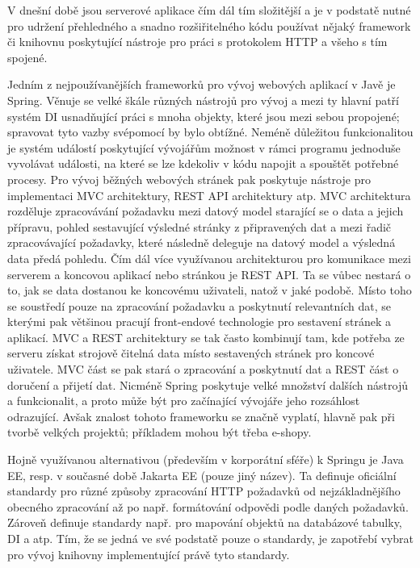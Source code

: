 		V dnešní době jsou serverové aplikace čím dál tím složitější a je v podstatě nutné pro udržení
		přehledného a snadno rozšiřitelného kódu používat nějaký framework
		či knihovnu poskytující nástroje pro práci s protokolem \Ac{HTTP} a všeho s tím spojené.

		Jedním z nejpoužívanějších frameworků pro vývoj webových aplikací v Javě je Spring.
		Věnuje se velké škále různých nástrojů pro vývoj a mezi ty hlavní patří systém \Ac{DI} usnadňující práci s
		mnoha objekty, které jsou mezi sebou propojené; spravovat tyto vazby svépomocí by bylo obtížné.
		Neméně důležitou funkcionalitou je systém událostí poskytující vývojářům možnost v rámci programu jednoduše vyvolávat
		události, na které se lze kdekoliv v kódu napojit a spouštět potřebné procesy. \cite{spring_framework_documentation_core}
		Pro vývoj běžných webových stránek pak poskytuje nástroje pro implementaci \Ac{MVC}
		architektury, \Ac{REST} API architektury atp. \cite{spring_framework_documentaiton_web}
		\Ac{MVC} architektura rozděluje zpracovávání požadavku mezi datový model starající se o data a jejich přípravu,
		pohled sestavující výsledné stránky z připravených dat a mezi řadič zpracovávající požadavky,
		které následně deleguje na datový model a výsledná data předá pohledu. \cite{mvc}
		Čím dál více využívanou architekturou pro komunikace mezi serverem a koncovou aplikací nebo stránkou je \Ac{REST} \ac{API}.
		Ta se vůbec nestará o to, jak se data dostanou ke koncovému uživateli, natož v jaké podobě.
		Místo toho se soustředí pouze na zpracování požadavku a poskytnutí relevantních dat, se kterými pak
		většinou pracují front-endové technologie pro sestavení stránek a aplikací. \cite{restfulapi}
		\ac{MVC} a \ac{REST} architektury se tak často kombinují tam, kde potřeba ze serveru získat strojově čitelná data
		místo sestavených stránek pro koncové uživatele. \ac{MVC} část se pak stará o zpracování a poskytnutí dat
		a \ac{REST} část o doručení a přijetí dat.
		Nicméně Spring poskytuje velké množství dalších nástrojů a funkcionalit, a proto může být pro začínající vývojáře
		jeho rozsáhlost odrazující.
		Avšak znalost tohoto frameworku se značně vyplatí, hlavně pak při tvorbě velkých projektů; příkladem mohou být
		třeba e-shopy.

		Hojně využívanou alternativou (především v korporátní sféře) k Springu je Java EE, resp. v současné době
		Jakarta EE (pouze jiný název).
		Ta definuje oficiální standardy pro různé způsoby zpracování \Ac{HTTP} požadavků od nejzákladnějšího obecného
		zpracování až po např. formátování odpovědi podle daných požadavků.
		Zároveň definuje standardy např. pro mapování objektů na databázové tabulky, \Ac{DI} a atp.
		Tím, že se jedná ve své podstatě pouze o standardy, je zapotřebí vybrat pro vývoj knihovny implementující právě tyto
		standardy. \cite{jakarta_ee}

